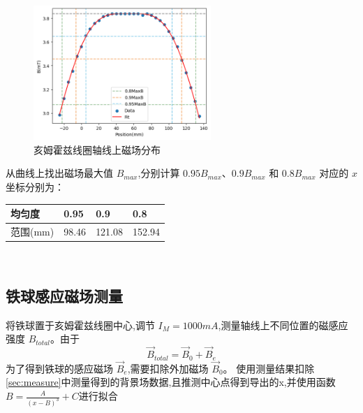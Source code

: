 \documentclass[UTF8]{ctexart}
\begin{document}
    \begin{figure}[htbp]
    \centering
    \includegraphics[width=0.6\textwidth]{B-x.png}
    \caption{亥姆霍兹线圈轴线上磁场分布}
    \label{fig:B-x}
    \end{figure}
\newpage
    从曲线上找出磁场最大值 $B_{max}$,分别计算 $0.95B_{max}$、$0.9B_{max}$ 和 $0.8B_{max}$ 对应的 $x$ 坐标分别为：
    \begin{table}[htbp]
        \centering
        \begin{tabular}{|l|l|l|l|}
            \hline
            均匀度&0.95&0.9&0.8\\
            \hline
            范围(mm)&98.46&121.08&152.94\\
            \hline
        \end{tabular}
    \end{table}
    \\
    \subsection{铁球感应磁场测量}
    将铁球置于亥姆霍兹线圈中心,调节 $I_M=1000mA$,测量轴线上不同位置的磁感应强度 $B_{total}$。由于
    \begin{equation}
    \vec{B}_{total} = \vec{B}_0 + \vec{B}_e     
    \end{equation}
    为了得到铁球的感应磁场 $\vec{B}_e$,需要扣除外加磁场 $\vec{B}_0$。
    使用测量结果扣除\ref{sec:measure}中测量得到的背景场数据,且推测中心点得到导出的x,并使用函数$B = \frac{A}{(x-B)^3}+C$进行拟合
    
\end{document}
